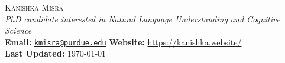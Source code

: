 \documentclass[11pt]{article}
\begin{document}
\begin{center}
\textsc{\LARGE Kanishka Misra} \\
\vspace{3mm}
\textit{PhD candidate interested in Natural Language Understanding and Cognitive Science}\\
\textbf{Email:} \href{mailto:kmisra@purdue.edu}{\texttt{kmisra@purdue.edu}} \hspace{1em}
\textbf{Website:} \url{https://kanishka.website/}\\
\textbf{Last Updated:} \today
\end{center}


\end{document}
